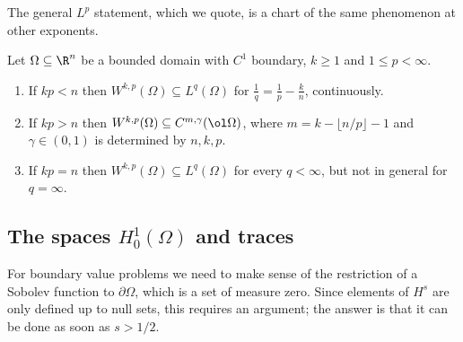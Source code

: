 The general $L^p$ statement, which we quote, is a chart of the same phenomenon at other exponents.

\begin{theorem}\label{thm:sobolevchart}
	Let $\Omega\subseteq\R^n$ be a bounded domain with $C^1$ boundary, $k\ge1$ and $1\le p<\infty$.
	\begin{enumerate}[label=(\roman*)]
		\item If $kp<n$ then $W^{k,p}(\Omega)\subseteq L^q(\Omega)$ for $\frac1q=\frac1p-\frac kn$, continuously.
		\item If $kp>n$ then $W^{k,p}(\Omega)\subseteq C^{m,\gamma}(\ol\Omega)$, where $m=k-\lfloor n/p\rfloor-1$ and $\gamma\in(0,1)$ is determined by $n,k,p$.
		\item If $kp=n$ then $W^{k,p}(\Omega)\subseteq L^q(\Omega)$ for every $q<\infty$, but not in general for $q=\infty$.
	\end{enumerate}
\end{theorem}

\begin{center}
\end{center}

\subsection{The spaces \texorpdfstring{$H_0^1(\Omega)$}{H10} and traces}

For boundary value problems we need to make sense of the restriction of a Sobolev function to $\partial\Omega$, which is a set of measure zero. Since elements of $H^s$ are only defined up to null sets, this requires an argument; the answer is that it can be done as soon as $s>1/2$.

